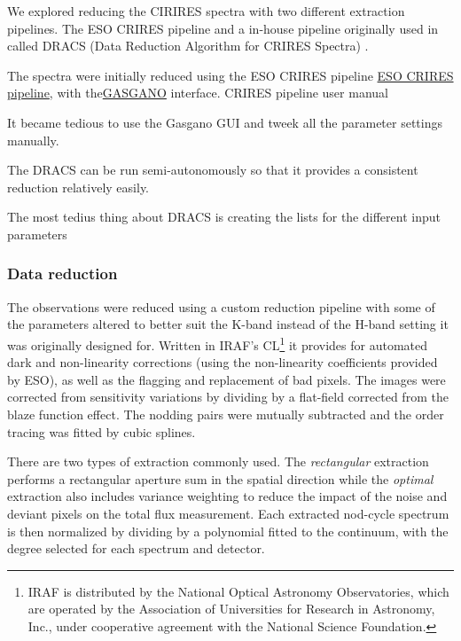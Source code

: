 We explored reducing the CIRIRES spectra with two different extraction pipelines. The ESO CRIRES pipeline and a in-house pipeline originally used in \citet{figueira_radial_2010} called DRACS (Data Reduction Algorithm for CRIRES Spectra) .


The spectra were initially reduced using the ESO CRIRES pipeline \href{ESO CRIRES pipeline}{ESO CRIRES pipeline}, with the\href{https://www.eso.org/sci/software/gasgano.html}{GASGANO} interface.  CRIRES pipeline user manual 

It became tedious to use the Gasgano GUI and tweek all the parameter settings manually. 

The DRACS can be run semi-autonomously so that it provides a consistent reduction relatively easily.



The most tedius thing about DRACS is creating the lists for the different input parameters



\subsubsection{Data reduction}
\label{subsubsec:reduction}
The observations were reduced using a custom reduction pipeline \citep{figueira_radial_2010} with some of the parameters altered to better suit the K-band instead of the H-band setting it was originally designed for. Written in IRAF's CL\footnote{IRAF is distributed by the National Optical Astronomy Observatories, which are operated by the Association of Universities for Research in Astronomy, {Inc.}, under cooperative agreement with the National Science Foundation.} \citep{tody_iraf_1993} it provides for automated dark and non-linearity corrections (using the non-linearity coefficients provided by ESO), as well as the flagging and replacement of bad pixels. The images were corrected from sensitivity variations by dividing by a flat-field corrected from the blaze function effect. The nodding pairs were mutually subtracted and the order tracing was fitted by cubic splines.  

There are two types of extraction commonly used. The \emph{rectangular} extraction performs a rectangular aperture sum in the spatial direction while the \emph{optimal} extraction \citep{horne_optimal_1986} also includes variance weighting to reduce the impact of the noise and deviant pixels on the total flux measurement. Each extracted nod-cycle spectrum is then normalized by dividing by a polynomial fitted to the continuum, with the degree selected for each spectrum and detector.

